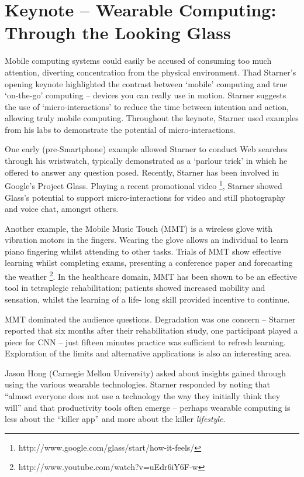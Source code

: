 \section{Keynote -- Wearable Computing: Through the Looking Glass}
\label{sec:keynote}
Mobile computing systems could easily be accused of consuming too much
attention, diverting concentration from the physical environment. Thad
Starner's opening keynote highlighted the contrast between `mobile'
computing and true `on-the-go' computing -- devices you can really use in
motion. Starner suggests the use of `micro-interactions' to reduce the time 
between intention and action, allowing truly mobile computing. Throughout the 
keynote, Starner used examples from his labs to demonstrate the potential of 
micro-interactions.


One early (pre-Smartphone) example allowed Starner to conduct Web searches 
through his wristwatch, typically demonstrated as a `parlour trick' in which 
he offered to answer any question posed. Recently, Starner has been involved in 
Google's Project Glass. Playing a recent promotional video 
\footnote{http://www.google.com/glass/start/how-it-feels/}, Starner showed 
Glass's potential to support micro-interactions for video and still 
photography and voice chat, amongst others.

Another example, the Mobile Music Touch (MMT) is a wireless glove
with vibration motors in the fingers. Wearing the glove allows an individual to
learn piano fingering whilst attending to other tasks.
Trials of MMT show effective learning whilst completing exams, presenting a
conference paper and forecasting the weather
\footnote{http://www.youtube.com/watch?v=uEdr6iY6F-w}. In the healthcare domain,
MMT has been shown to be an effective tool in tetraplegic rehabilitation; 
patients showed increased mobility and sensation, whilst the learning of a life-
long skill provided incentive to continue.

MMT dominated the audience questions. Degradation was one concern -- Starner 
reported that six months after their rehabilitation study, one participant played 
a piece for CNN -- just fifteen minutes practice was sufficient to refresh 
learning. Exploration of the limits and alternative applications is also an 
interesting area.

Jason Hong (Carnegie Mellon University) asked about insights gained through using
the various wearable technologies. Starner responded by noting that 
``almost everyone does not use a technology the way they initially 
think they will'' and that productivity tools often emerge -- perhaps wearable 
computing is less about the ``killer app'' and more about the killer 
\emph{lifestyle}.